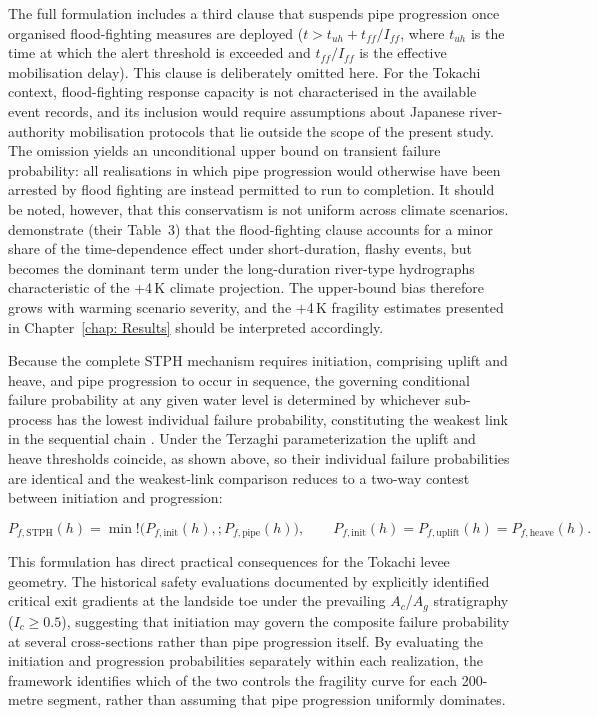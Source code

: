 The full \textcite{pol_sie_2024} formulation includes a third clause that suspends pipe progression once organised flood-fighting measures are deployed ($t > t_{uh} + t_{ff}/I_{ff}$, where $t_{uh}$ is the time at which the alert threshold is exceeded and $t_{ff}/I_{ff}$ is the effective mobilisation delay). This clause is deliberately omitted here. For the Tokachi context, flood-fighting response capacity is not characterised in the available event records, and its inclusion would require assumptions about Japanese river-authority mobilisation protocols that lie outside the scope of the present study. The omission yields an unconditional upper bound on transient failure probability: all realisations in which pipe progression would otherwise have been arrested by flood fighting are instead permitted to run to completion. It should be noted, however, that this conservatism is not uniform across climate scenarios. \textcite{pol_sie_2024} demonstrate (their Table~3) that the flood-fighting clause accounts for a minor share of the time-dependence effect under short-duration, flashy events, but becomes the dominant term under the long-duration river-type hydrographs characteristic of the +4\,K climate projection. The upper-bound bias therefore grows with warming scenario severity, and the +4\,K fragility estimates presented in Chapter~\ref{chap: Results} should be interpreted accordingly.

Because the complete STPH mechanism requires initiation, comprising uplift and heave, and pipe progression to occur in sequence, the governing conditional failure probability at any given water level is determined by whichever sub-process has the lowest individual failure probability, constituting the weakest link in the sequential chain \parencite{ENW2017}. Under the Terzaghi parameterization the uplift and heave thresholds coincide, as shown above, so their individual failure probabilities are identical and the weakest-link comparison reduces to a two-way contest between initiation and progression:

$$P_{f,\mathrm{STPH}}(h) = \min!\bigl(P_{f,\mathrm{init}}(h),; P_{f,\mathrm{pipe}}(h)\bigr), \qquad P_{f,\mathrm{init}}(h) = P_{f,\mathrm{uplift}}(h) = P_{f,\mathrm{heave}}(h).$$

This formulation has direct practical consequences for the Tokachi levee geometry. The historical safety evaluations documented by \textcite{oyo_1999} explicitly identified critical exit gradients at the landside toe under the prevailing $A_c$/$A_g$ stratigraphy ($I_c \geq 0.5$), suggesting that initiation may govern the composite failure probability at several cross-sections rather than pipe progression itself. By evaluating the initiation and progression probabilities separately within each realization, the framework identifies which of the two controls the fragility curve for each 200-metre segment, rather than assuming that pipe progression uniformly dominates.


